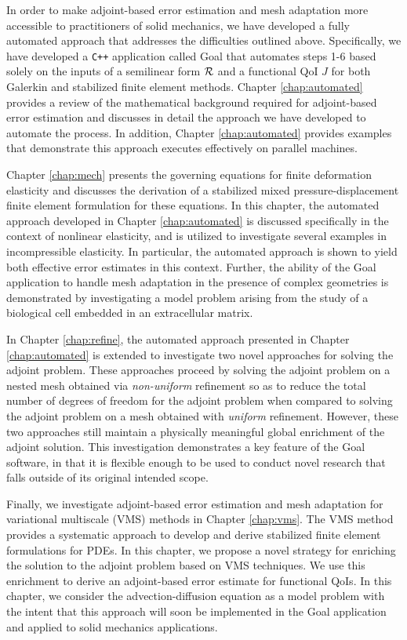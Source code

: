 In order to make adjoint-based error estimation and mesh adaptation
more accessible to practitioners of solid mechanics, we have developed
a fully automated approach that addresses the difficulties outlined
above. Specifically, we have developed a \texttt{C++} application called
Goal that automates steps 1-6 based solely on the inputs of a
semilinear form $\mathcal{R}$ and a functional QoI $J$ for both Galerkin and
stabilized finite element methods. Chapter \ref{chap:automated}
provides a review of the mathematical background required for
adjoint-based error estimation and discusses in detail the approach
we have developed to automate the process. In addition, Chapter
\ref{chap:automated} provides examples that demonstrate this approach
executes effectively on parallel machines.

Chapter \ref{chap:mech} presents the governing equations for
finite deformation elasticity and discusses the derivation
of a stabilized mixed pressure-displacement finite element
formulation for these equations. In this chapter, the automated
approach developed in Chapter \ref{chap:automated} is discussed
specifically in the context of nonlinear elasticity, and is utilized
to investigate several examples in incompressible elasticity.
In particular, the automated approach is shown to yield both
effective error estimates in this context. Further, the ability of the
Goal application to handle mesh adaptation in the presence of complex
geometries is demonstrated by investigating a model problem arising
from the study of a biological cell embedded in an extracellular
matrix.

In Chapter \ref{chap:refine}, the automated approach presented in
Chapter \ref{chap:automated} is extended to investigate two
novel approaches for solving the adjoint problem.
These approaches proceed by solving the adjoint problem on a
nested mesh obtained via \emph{non-uniform} refinement so as to
reduce the total number of degrees of freedom for the adjoint problem
when compared to solving the adjoint problem on a mesh obtained
with \emph{uniform} refinement. However, these two approaches still
maintain a physically meaningful global enrichment of the adjoint
solution. This investigation demonstrates a key feature of the Goal
software, in that it is flexible enough to be used to conduct novel
research that falls outside of its original intended scope.

Finally, we investigate adjoint-based error estimation and mesh
adaptation for variational multiscale (VMS) methods in Chapter \ref{chap:vms}.
The VMS method provides a systematic approach to develop and derive
stabilized finite element formulations for PDEs. In this chapter,
we propose a novel strategy for enriching the solution to the
adjoint problem based on VMS techniques. We use this enrichment to
derive an adjoint-based error estimate for functional QoIs.
In this chapter, we consider the advection-diffusion equation as a
model problem with the intent that this approach will soon
be implemented in the Goal application and applied to
solid mechanics applications.

